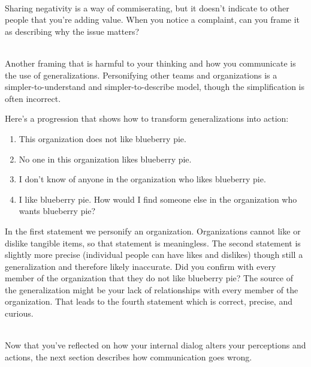 \ \\
Sharing negativity is a way of commiserating, but it doesn't indicate to other people that you're adding value.  
When you notice a complaint, can you frame it as describing why the issue matters? 

\ \\

Another framing that is harmful to your thinking and how you communicate is the use of generalizations. Personifying other teams and organizations is a simpler-to-understand and simpler-to-describe model, though the simplification is often incorrect. 

Here's a progression that shows how to transform generalizations into action: 
\begin{enumerate}
    \item This organization does not like blueberry pie.
    \item No one in this organization likes blueberry pie.
    \item I don't know of anyone in the organization who likes blueberry pie.
    \item I like blueberry pie. How would I find someone else in the organization who wants blueberry pie?
\end{enumerate}
In the first statement we personify an organization. Organizations cannot like or dislike tangible items, so that statement is meaningless. The second statement is slightly more precise (individual people can have likes and dislikes) though still a generalization and therefore likely inaccurate. Did you confirm with every member of the organization that they do not like blueberry pie? The source of the generalization might be your lack of relationships with every member of the organization. That leads to the fourth statement which is correct, precise, and curious. 

\ \\

Now that you've reflected on how your internal dialog alters your perceptions and actions, the next section describes how communication goes wrong.